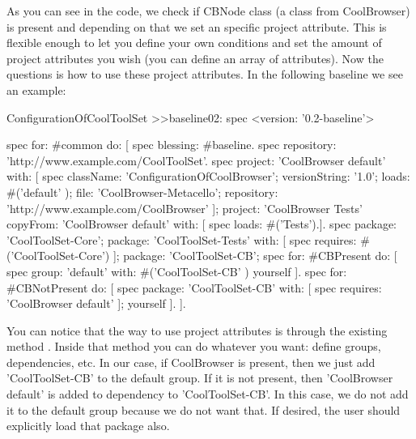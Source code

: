 \documentclass[a4paper,10pt,twoside]{book}
\begin{document}
As you can see in the code, we check if CBNode class (a class from CoolBrowser) is present and depending on that we set an specific project attribute.
This is flexible enough to let you define your own conditions and set the amount of project attributes you wish (you can define an array of attributes).  
Now the questions is how to use these project attributes. In the following baseline we see an example:

\begin{code}{}
ConfigurationOfCoolToolSet >>baseline02: spec 
       <version: '0.2-baseline'>
       
       spec for: #common do: [
              spec blessing: #baseline.
              spec repository: 'http://www.example.com/CoolToolSet'.
              spec project: 'CoolBrowser default' with: [
                            spec
                                   className: 'ConfigurationOfCoolBrowser';
                                   versionString: '1.0';
                                   loads: #('default' );
                                   file: 'CoolBrowser-Metacello';
                                   repository: 'http://www.example.com/CoolBrowser' ];
                     project: 'CoolBrowser Tests' 
                            copyFrom: 'CoolBrowser default' 
                            with: [ spec loads: #('Tests').].
              spec 
                     package: 'CoolToolSet-Core';
                     package: 'CoolToolSet-Tests' with: [ 
                            spec requires: #('CoolToolSet-Core') ];
                     package: 'CoolToolSet-CB';                     
              spec for: #CBPresent do: [
                     spec
                            group: 'default' with: #('CoolToolSet-CB' )
                            yourself ].
              spec for: #CBNotPresent do: [
                     spec 
                            package: 'CoolToolSet-CB' with: [ spec requires: 'CoolBrowser default' ];
                            yourself ].
                     ].
              
\end{code}

You can notice that the way to use project attributes is through the existing method . Inside that method you can do whatever you want: define groups, dependencies, etc. In our case, if CoolBrowser is present, then we just add 'CoolToolSet-CB' to the default group. If it is not present, then 'CoolBrowser default' is added to dependency to 'CoolToolSet-CB'. In this case, we do not add it to the default group because we do not want that. If desired, the user should explicitly load that package also. 
\end{document}
